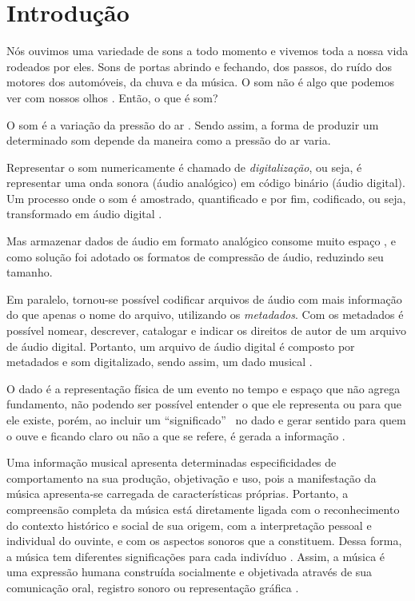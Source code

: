 \chapter{Introdução} \label{cap:introducao}
Nós ouvimos uma variedade de sons a todo momento e vivemos toda a nossa vida rodeados por eles. Sons de portas abrindo e fechando, dos passos, do ruído dos motores dos automóveis, da chuva e da música. O som não é algo que podemos ver com nossos olhos \cite{miletto2004}. Então, o que é som?

O som é a variação da pressão do ar \cite{muller2007}. Sendo assim, a forma de produzir um determinado som depende da maneira como a pressão do ar varia. 

Representar o som numericamente é chamado de \textit{digitalização}, ou seja, é representar uma onda sonora (áudio analógico) em código binário (áudio digital). Um processo onde o som é amostrado, quantificado e por fim, codificado, ou seja, transformado em áudio digital \cite{paulozuben2004}.

Mas armazenar dados de áudio em formato analógico consome muito espaço \cite{juliana2004}, e como solução foi adotado os formatos de compressão de áudio, reduzindo seu tamanho.

Em paralelo, tornou-se possível codificar arquivos de áudio com mais informação do que apenas o nome do arquivo, utilizando os \textit{metadados}. Com os metadados é possível nomear, descrever, catalogar e indicar os direitos de autor de um arquivo de áudio digital. Portanto, um arquivo de áudio digital é composto por metadados e som digitalizado, sendo assim, um dado musical . 

O dado é a representação física de um evento no tempo e espaço que não agrega fundamento, não podendo ser possível entender o que ele representa ou para que ele existe, porém, ao incluir um “significado” \ no dado e gerar sentido para quem o ouve e ficando claro ou não a que se refere, é gerada a informação \cite{rafael2013}.

Uma informação musical apresenta determinadas especificidades de comportamento na sua produção, objetivação e uso, pois a manifestação da música apresenta-se carregada de características próprias. Portanto, a compreensão completa da música está diretamente ligada com o reconhecimento do contexto histórico e social de sua origem, com a interpretação pessoal e individual do ouvinte, e com os aspectos sonoros que a constituem. Dessa forma, a música tem diferentes significações para cada indivíduo \cite{michels1992}. Assim, a música é uma expressão humana construída socialmente e objetivada através de sua comunicação oral, registro sonoro ou representação gráfica \cite{barros2012}.

